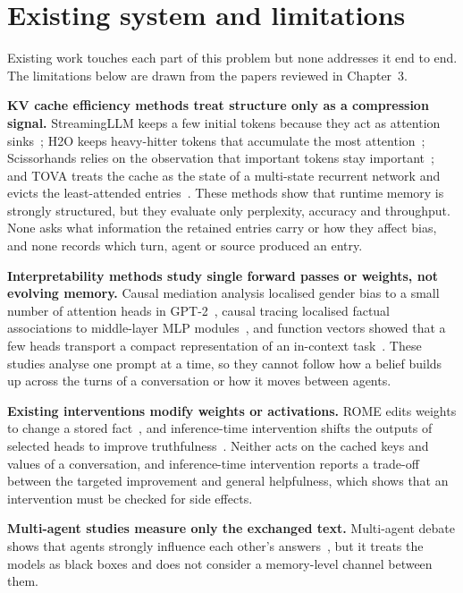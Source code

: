 \section{Existing system and limitations}
Existing work touches each part of this problem but none addresses it end to end. The limitations below are drawn from the papers reviewed in Chapter~3.

\textbf{KV cache efficiency methods treat structure only as a compression signal.} StreamingLLM keeps a few initial tokens because they act as attention sinks~\cite{xiao2024sinks}; H2O keeps heavy-hitter tokens that accumulate the most attention~\cite{zhang2023h2o}; Scissorhands relies on the observation that important tokens stay important~\cite{liu2023scissorhands}; and TOVA treats the cache as the state of a multi-state recurrent network and evicts the least-attended entries~\cite{oren2024msrnn}. These methods show that runtime memory is strongly structured, but they evaluate only perplexity, accuracy and throughput. None asks what information the retained entries carry or how they affect bias, and none records which turn, agent or source produced an entry.

\textbf{Interpretability methods study single forward passes or weights, not evolving memory.} Causal mediation analysis localised gender bias to a small number of attention heads in GPT-2~\cite{vig2020causal}, causal tracing localised factual associations to middle-layer MLP modules~\cite{meng2022rome}, and function vectors showed that a few heads transport a compact representation of an in-context task~\cite{todd2024fv}. These studies analyse one prompt at a time, so they cannot follow how a belief builds up across the turns of a conversation or how it moves between agents.

\textbf{Existing interventions modify weights or activations.} ROME edits weights to change a stored fact~\cite{meng2022rome}, and inference-time intervention shifts the outputs of selected heads to improve truthfulness~\cite{li2023iti}. Neither acts on the cached keys and values of a conversation, and inference-time intervention reports a trade-off between the targeted improvement and general helpfulness, which shows that an intervention must be checked for side effects.

\textbf{Multi-agent studies measure only the exchanged text.} Multi-agent debate shows that agents strongly influence each other's answers~\cite{du2024debate}, but it treats the models as black boxes and does not consider a memory-level channel between them.

